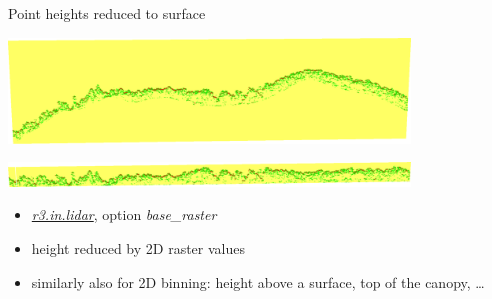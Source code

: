 \documentclass[xcolor={dvipsnames,usenames},beamer,aspectratio=43]{beamer}
\newcommand{\gmodule}[1]{\href{http://grass.osgeo.org/grass71/manuals/#1.html}{\emph{#1}}}
\begin{document}
\begin{frame}{Point heights reduced to surface}

\begin{center}
  \includegraphics[width=0.8\textwidth]{features/rast3_real}

  \bigskip

  \includegraphics[width=0.8\textwidth]{features/rast3_base}
\end{center}

\begin{itemize}
  \item \gmodule{r3.in.lidar}, option \textit{base\_raster}
  \item height reduced by 2D raster values
  \item similarly also for 2D binning: height above a surface, top of the canopy, \ldots

\end{itemize}

\end{frame}
\end{document}
